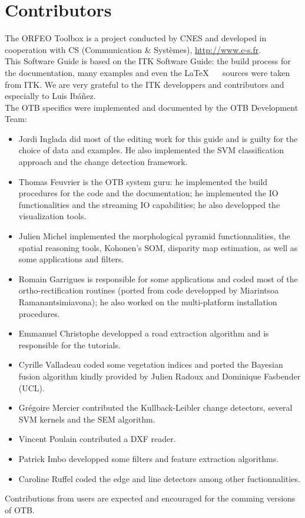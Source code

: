 \chapter*{Contributors}
\noindent

The ORFEO Toolbox is a project conducted by CNES and developed in
cooperation with CS (Communication \& Syst\`{e}mes), \url{http://www.c-s.fr}.\\

This Software Guide is based on the ITK Software Guide: the build
process for the documentation, many examples and even the \LaTeX~ ~
sources were taken from ITK. We are very grateful to the ITK
developpers and contributors and especially to Luis Ib\'a\~nez.\\

The OTB specifics were implemented and documented by the OTB Development Team:
\begin{itemize}
  \item Jordi Inglada did most of the editing work for this guide and
  is guilty for the choice of data and examples. He also implemented
  the SVM classification approach and the change detection framework.
  \item Thomas Feuvrier is the OTB system guru: he implemented the
  build procedures for the code and the documentation; he implemented
  the IO functionalities and the streaming IO capabilities; he also
  developped the visualization tools.
  \item Julien Michel implemented the morphological pyramid
  functionnalities, the spatial reasoning tools, Kohonen's SOM,
  disparity map estimation, as
  well as some applications and filters.
\item Romain Garrigues is responsible for some applications and coded
  most of the ortho-rectification routines (ported from code
  developped by Miarintsoa Ramanantsimiavona); he also
  worked on the multi-platform installation procedures.
\item Emmanuel Christophe developped a road extraction algorithm and
  is responsible for the tutorials.
  \item Cyrille Valladeau coded some vegetation indices and ported the
  Bayesian fusion algorithm kindly provided by Julien Radoux and Dominique Fasbender (UCL).
  \item Gr\'egoire Mercier contributed the Kullback-Leibler change
  detectors, several SVM kernels and the SEM algorithm.
  \item Vincent Poulain contributed a DXF reader. 
  \item Patrick Imbo developped some filters and feature
  extraction algorithms.
  \item Caroline Ruffel coded the edge and line detectors among other
  fuctionnalities.



\end{itemize}

Contributions from users are expected and encouraged for the comming
versions of OTB.

